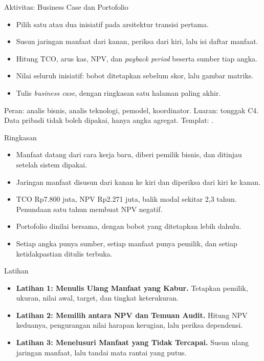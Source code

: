 \documentclass[aspectratio=169, table, 12pt]{beamer}
\begin{document}
\begin{frame}{{\Large Aktivitas: Business Case dan Portofolio}}
  \small
  \begin{itemize}
    \item Pilih satu atau dua inisiatif pada arsitektur transisi pertama.
    \item Susun jaringan manfaat dari kanan, periksa dari kiri, lalu isi daftar manfaat.
    \item Hitung TCO, arus kas, NPV, dan \textit{payback period} beserta sumber tiap angka.
    \item Nilai seluruh inisiatif: bobot ditetapkan sebelum skor, lalu gambar matriks.
    \item Tulis \textit{business case}, dengan ringkasan satu halaman paling akhir.
  \end{itemize}
  \footnotesize Peran: analis bisnis, analis teknologi, pemodel, koordinator. Luaran: tonggak C4.
  Data pribadi tidak boleh dipakai, hanya angka agregat.
  Templat: .
\end{frame}

\begin{frame}{{\Large Ringkasan}}
  \small
  \vspace{4pt}
  \begin{itemize}
    \item Manfaat datang dari cara kerja baru, diberi pemilik bisnis, dan ditinjau setelah sistem
          dipakai.
    \item Jaringan manfaat disusun dari kanan ke kiri dan diperiksa dari kiri ke kanan.
    \item TCO Rp7.800 juta, NPV Rp2.271 juta, balik modal sekitar 2,3 tahun. Penundaan satu tahun membuat
          NPV negatif.
    \item Portofolio dinilai bersama, dengan bobot yang ditetapkan lebih dahulu.
    \item Setiap angka punya sumber, setiap manfaat punya pemilik, dan setiap ketidakpastian ditulis
          terbuka.
  \end{itemize}
\end{frame}

\begin{frame}{{\Large Latihan}}
  \small
  \vspace{6pt}
  \begin{itemize}
    \item \textbf{Latihan 1: Menulis Ulang Manfaat yang Kabur.} Tetapkan pemilik, ukuran, nilai awal,
          target, dan tingkat keterukuran.
    \item \textbf{Latihan 2: Memilih antara NPV dan Temuan Audit.} Hitung NPV keduanya, pengurangan nilai
          harapan kerugian, lalu periksa dependensi.
    \item \textbf{Latihan 3: Menelusuri Manfaat yang Tidak Tercapai.} Susun ulang jaringan manfaat, lalu
          tandai mata rantai yang putus.
  \end{itemize}
\end{frame}
\end{document}
